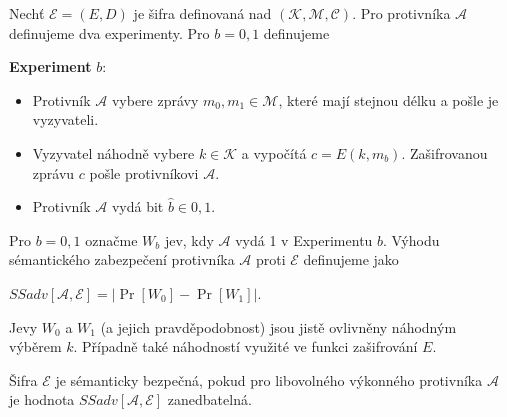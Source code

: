 \documentclass[
  program=infoi,
  biblatex,
  figures=false,
  glossaries,
  index
]{kidiplom}
\begin{document}
        \begin{definition}
            
            Nechť $\mathcal{E}  = (E, D)$ je šifra definovaná nad $(\mathcal{K},\mathcal{M},\mathcal{C})$.
            Pro protivníka $\mathcal{A}$ definujeme dva experimenty. Pro $b = 0, 1$ definujeme

            \medskip

            \textbf{Experiment} $b$:

            \begin{itemize}
                \item 
                    Protivník $\mathcal{A}$ vybere zprávy $m_0, m_1 \in \mathcal{M}$, které mají stejnou délku a pošle je vyzyvateli.
                \item
                    Vyzyvatel náhodně vybere $k \in \mathcal{K}$ a vypočítá $c = E(k, m_b)$.
                    Zašifrovanou zprávu $c$ pošle protivníkovi $\mathcal{A}$.
                \item
                    Protivník $\mathcal{A}$ vydá bit $\hat{b} \in {0,1}$.
            \end{itemize}

            Pro $b = 0, 1$ označme $W_b$ jev, kdy $\mathcal{A}$ vydá 1 v Experimentu $b$.
            Výhodu sémantického zabezpečení protivníka $\mathcal{A}$ proti $\mathcal{E}$ definujeme jako

            \begin{center}
                $SSadv[\mathcal{A}, \mathcal{E}] = \left\lvert\Pr[W_0] - \Pr[W_1]\right\rvert$.
            \end{center}

        \end{definition}

        \begin{remark}
            Jevy $W_0$ a $W_1$ (a jejich pravděpodobnost) jsou jistě ovlivněny náhodným výběrem $k$.
            Případně také náhodností využité ve funkci zašifrování $E$.
        \end{remark}

        \begin{definition}
            Šifra $\mathcal{E}$ je sémanticky bezpečná, pokud pro libovolného výkonného protivníka $\mathcal{A}$
            je hodnota $SSadv[\mathcal{A}, \mathcal{E}]$ zanedbatelná.
        \end{definition}
\end{document}
